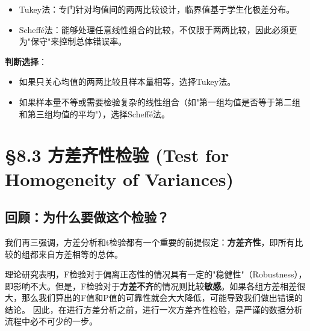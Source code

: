 \documentclass[12pt, a4paper]{amsart}
\begin{document}
\begin{itemize}
    \item Tukey法：专门针对均值间的两两比较设计，临界值基于学生化极差分布。
    \item Scheffé法：能够处理任意线性组合的比较，不仅限于两两比较，因此必须更为"保守"来控制总体错误率。
\end{itemize}

\textbf{判断选择}：
\begin{itemize}
    \item 如果只关心均值的两两比较且样本量相等，选择Tukey法。
    \item 如果样本量不等或需要检验复杂的线性组合（如"第一组均值是否等于第二组和第三组均值的平均"），选择Scheffé法。
\end{itemize}

\section{§8.3 方差齐性检验 (Test for Homogeneity of Variances)}
\subsection{回顾：为什么要做这个检验？}
我们再三强调，方差分析和t检验都有一个重要的前提假定：\textbf{方差齐性}，即所有比较的组都来自方差相等的总体。

理论研究表明，F检验对于偏离正态性的情况具有一定的"稳健性"（Robustness），即影响不大。但是，F检验对于\textbf{方差不齐}的情况则比较\textbf{敏感}。如果各组方差相差很大，那么我们算出的F值和P值的可靠性就会大大降低，可能导致我们做出错误的结论。
因此，在进行方差分析之前，进行一次方差齐性检验，是严谨的数据分析流程中必不可少的一步。
\end{document}
